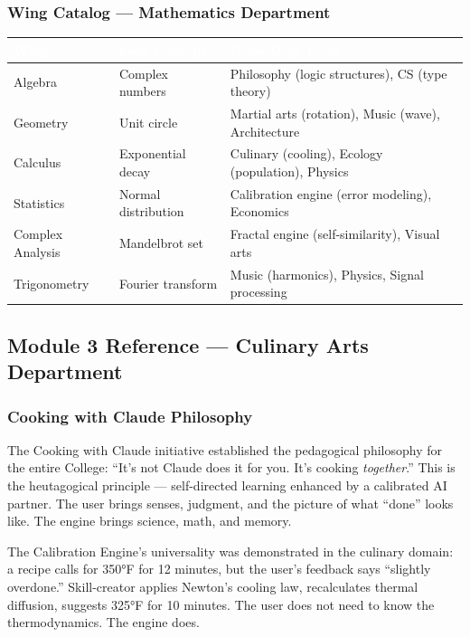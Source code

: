 \documentclass[11pt,letterpaper]{article}
\newcommand{\tableheader}[1]{\textbf{\sffamily\textcolor{white}{#1}}}
\begin{document}
\subsubsection{Wing Catalog --- Mathematics Department}

\begin{center}
\begin{tabularx}{\textwidth}{L{3cm}L{3.5cm}X}
\toprule
{}
\tableheader{Wing} & \tableheader{Seed Concept} & \tableheader{Cross-Dept Links} \\
\midrule
Algebra & Complex numbers & Philosophy (logic structures), CS (type theory) \\
Geometry & Unit circle & Martial arts (rotation), Music (wave), Architecture \\
Calculus & Exponential decay & Culinary (cooling), Ecology (population), Physics \\
Statistics & Normal distribution & Calibration engine (error modeling), Economics \\
Complex Analysis & Mandelbrot set & Fractal engine (self-similarity), Visual arts \\
Trigonometry & Fourier transform & Music (harmonics), Physics, Signal processing \\
\bottomrule
\end{tabularx}
\end{center}

\subsection{Module 3 Reference --- Culinary Arts Department}

\subsubsection{Cooking with Claude Philosophy}

The Cooking with Claude initiative established the pedagogical philosophy for the entire College: ``It's not Claude does it for you. It's cooking \textit{together}.'' This is the heutagogical principle --- self-directed learning enhanced by a calibrated AI partner. The user brings senses, judgment, and the picture of what ``done'' looks like. The engine brings science, math, and memory.

The Calibration Engine's universality was demonstrated in the culinary domain: a recipe calls for 350°F for 12 minutes, but the user's feedback says ``slightly overdone.'' Skill-creator applies Newton's cooling law, recalculates thermal diffusion, suggests 325°F for 10 minutes. The user does not need to know the thermodynamics. The engine does.
\end{document}
